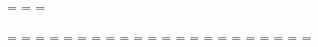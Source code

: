 \def\rm{\fam\z@\textrm}
\def\it{\fam\itfam\textit} \textfont\itfam=\textit %
\def\sl{\fam\slfam\textsl} \textfont\slfam=\textsl %
\def\bf{\fam\bffam\textbf} \textfont\bffam=\textbf %

\newfam\scrfam \edef\scrfam@{\hex@\scrfam}
\def\scr{\fam\scrfam }
\newfam\frfam \edef\frfam@{\hex@\frfam}
\def\frak{\fam\frfam }
\newfam\euexfam \edef\euexfam@{\hex@\euexfam}
\newfam\eqfam \edef\eqfam@{\hex@\eqfam}

=\mathtext
 =\mathsubtext
 =\mathsubsubtext
{}=\mathlet \let\tfont=\teni
 =\mathsublet
 =\mathsubsublet
{}=\mathsym
 =\mathsubsym
 =\mathsubsubsym
{}=\mathext
 =\mathsubext
 =\mathsubsubext
\textfont\scrfam=\mathscr
 \scriptfont\scrfam=\mathsubscr
 \scriptscriptfont\scrfam=\mathsubsubscr
\textfont\frfam=\mathfr
 \scriptfont\frfam=\mathsubfr
 \scriptscriptfont\frfam=\mathsubsubfr
\textfont\euexfam=\matheuex
 \scriptfont\euexfam=\mathsubsym 
 \scriptscriptfont\euexfam=\mathsubsubsym
\textfont\eqfam=\teneq

